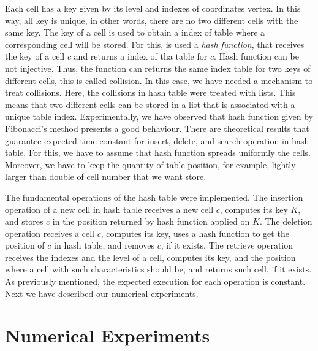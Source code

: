 \documentclass[review]{elsarticle}
\begin{document}
Each cell has a key given by its level and indexes of coordinates vertex. In this way, all key is unique, in other words, there are no two different cells with the same key. The key of a cell is used to obtain a index of table where a corresponding cell will be stored. For this, is used a {\em hash function}, that receives the key of a cell $c$ and returns a index of tha table for $c$. Hash function can be not injective. Thus, the function can returns the same index table for two keys of different cells, this is called collision. In this case, we have needed a mechanism to treat collisions. Here, the collisions in hash table were treated with lists. This means that two different cells can be stored in a list that is associated with a unique table index. Experimentally, we have observed that hash function given by Fibonacci's method \cite{KNU97} presents a good behaviour. There are theoretical results that guarantee expected time constant for insert, delete, and search operation in hash table. For this, we have to assume that hash function spreads uniformly the cells. Moreover, we have to keep the quantity of table position, for example, lightly larger than double of cell number that we want store.

 The fundamental operations of the hash table were implemented. The insertion operation of a new cell in hash table receives a new cell $c$, computes its key $K$, and stores $c$ in the position returned by hash function applied on $K$. The deletion operation receives a cell $c$, computes its key, uses a hash function to get the position of $c$ in hash table, and removes $c$, if it exists. The retrieve operation receives the indexes and the level of a cell, computes its key, and the position where a cell with such characteristics should be, and returns such cell, if it exists. As previously mentioned, the expected execution for each operation is constant. Next we have described our numerical experiments.

\section{Numerical Experiments}\label{sec-results}
\end{document}
